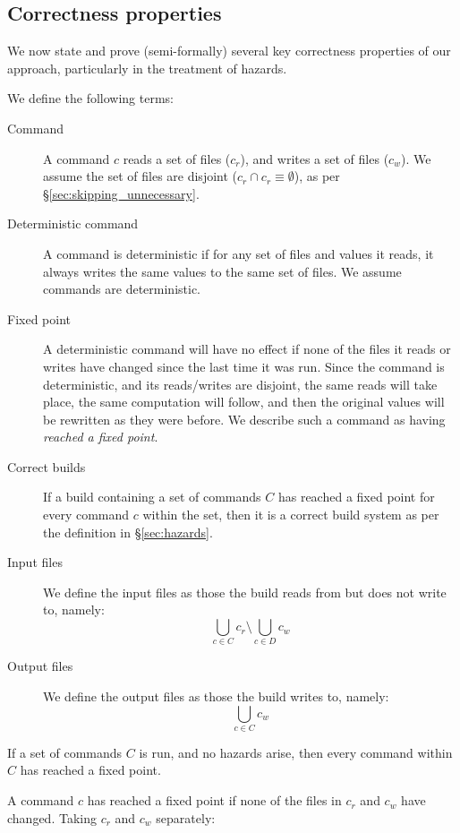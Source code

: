 \subsection{Correctness properties}

We now state and prove (semi-formally) several key correctness
properties of our approach, particularly in the treatment of hazards.

\label{sec:argument}

We define the following terms:

\begin{description}
\item[Command] A command $c$ reads a set of files ($c_r$), and writes a set of files ($c_w$). We assume the set of files are disjoint ($c_r \cap c_r \equiv \emptyset$), as per \S\ref{sec:skipping_unnecessary}.
\item[Deterministic command] A command is deterministic if for any set of files and values it reads, it always writes the same values to the same set of files. We assume commands are deterministic.
\item[Fixed point] A deterministic command will have no effect if none of the files it reads or writes have changed since the last time it was run. Since the command is deterministic, and its reads/writes are disjoint, the same reads will take place, the same computation will follow, and then the original values will be rewritten as they were before. We describe such a command as having \emph{reached a fixed point}.
\item[Correct builds] If a build containing a set of commands $C$ has reached a fixed point for every command $c$ within the set, then it is a correct build system as per the definition in \S\ref{sec:hazards}.
\item[Input files] We define the input files as those the build reads from but does not write to, namely:
\[
  \bigcup_{c \in C} c_r \setminus \bigcup_{c \in D} c_w
\]
\item[Output files] We define the output files as those the build writes to, namely:
\[
  \bigcup_{c \in C} c_w
\]
\end{description}

\begin{claim}[Completeness] If a set of commands $C$ is run, and no hazards arise, then every command within $C$ has reached a fixed point.
  \label{claim:complete}
\end{claim}

\proof A command $c$ has reached a fixed point if none of the files in $c_r$ and $c_w$ have changed. Taking $c_r$ and $c_w$ separately:

